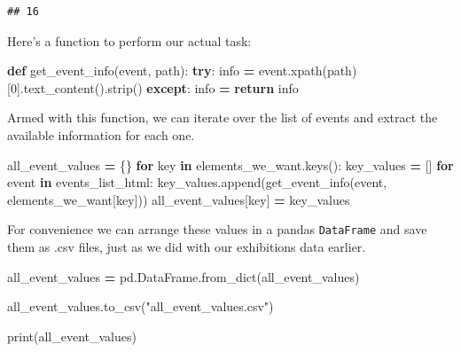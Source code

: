\documentclass[
]{book}
\newenvironment{Shaded}{\begin{snugshade}}{\end{snugshade}}
\newcommand{\BuiltInTok}[1]{#1}
\newcommand{\ControlFlowTok}[1]{\textcolor[rgb]{0.13,0.29,0.53}{\textbf{#1}}}
\newcommand{\DecValTok}[1]{\textcolor[rgb]{0.00,0.00,0.81}{#1}}
\newcommand{\KeywordTok}[1]{\textcolor[rgb]{0.13,0.29,0.53}{\textbf{#1}}}
\newcommand{\NormalTok}[1]{#1}
\newcommand{\OperatorTok}[1]{\textcolor[rgb]{0.81,0.36,0.00}{\textbf{#1}}}
\newcommand{\StringTok}[1]{\textcolor[rgb]{0.31,0.60,0.02}{#1}}
\begin{document}
\begin{verbatim}
## 16
\end{verbatim}

Here's a function to perform our actual task:

\begin{Shaded}
\begin{Highlighting}[]
\KeywordTok{def}\NormalTok{ get\_event\_info(event, path):}
    \ControlFlowTok{try}\NormalTok{:}
\NormalTok{        info }\OperatorTok{=}\NormalTok{ event.xpath(path)[}\DecValTok{0}\NormalTok{].text\_content().strip()}
    \ControlFlowTok{except}\NormalTok{:}
\NormalTok{        info }\OperatorTok{=} \StringTok{\textquotesingle{}\textquotesingle{}}
    \ControlFlowTok{return}\NormalTok{ info}
\end{Highlighting}
\end{Shaded}

Armed with this function, we can iterate over the list of events and extract the available information for each one.

\begin{Shaded}
\begin{Highlighting}[]
\NormalTok{all\_event\_values }\OperatorTok{=}\NormalTok{ \{\}}
\ControlFlowTok{for}\NormalTok{ key }\KeywordTok{in}\NormalTok{ elements\_we\_want.keys():}
\NormalTok{    key\_values }\OperatorTok{=}\NormalTok{ []}
    \ControlFlowTok{for}\NormalTok{ event }\KeywordTok{in}\NormalTok{ events\_list\_html: }
\NormalTok{        key\_values.append(get\_event\_info(event, elements\_we\_want[key]))}
\NormalTok{    all\_event\_values[key] }\OperatorTok{=}\NormalTok{ key\_values}
\end{Highlighting}
\end{Shaded}

For convenience we can arrange these values in a pandas \texttt{DataFrame} and save them as .csv files, just as we did with our exhibitions data earlier.

\begin{Shaded}
\begin{Highlighting}[]
\NormalTok{all\_event\_values }\OperatorTok{=}\NormalTok{ pd.DataFrame.from\_dict(all\_event\_values)}

\NormalTok{all\_event\_values.to\_csv(}\StringTok{"all\_event\_values.csv"}\NormalTok{)}

\BuiltInTok{print}\NormalTok{(all\_event\_values)}
\end{Highlighting}
\end{Shaded}
\end{document}
